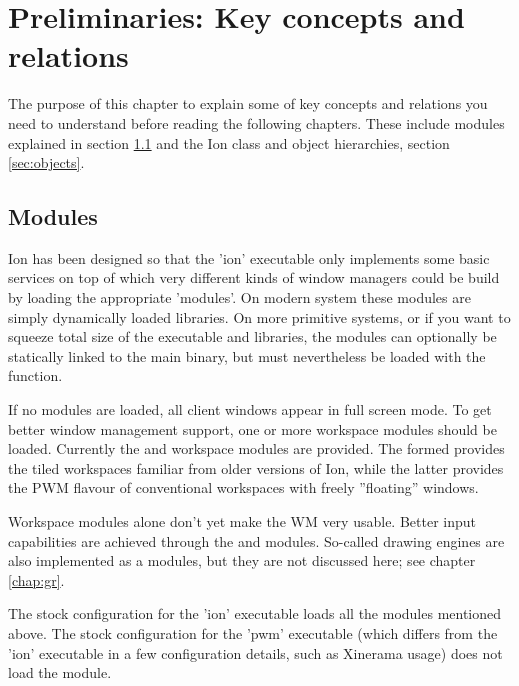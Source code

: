 
\chapter{Preliminaries: Key concepts and relations}
\label{chap:prelim}

The purpose of this chapter to explain some of key concepts and
relations you need to understand before reading the following
chapters. These include modules explained in section \ref{sec:modules}
and the Ion class and object hierarchies, section \ref{sec:objects}.


\section{Modules}
\label{sec:modules}

Ion has been designed so that the 'ion' executable only implements some
basic services on top of which very different kinds of window managers
could be build by loading the appropriate 'modules'. On modern system
these modules are simply dynamically loaded  libraries. On 
more primitive systems, or if you want to squeeze total size of the 
executable and libraries, the modules can optionally be statically 
linked to the main binary, but must nevertheless be loaded with the
 function.

If no modules are loaded, all client windows appear in full screen mode.
To get better window management support, one or more workspace modules
should be loaded. Currently the  and 
workspace modules are provided. The formed provides the tiled workspaces 
familiar from older versions of Ion, while the latter provides the PWM
flavour of conventional workspaces with freely ''floating'' windows.

Workspace modules alone don't yet make the WM very usable. Better
input capabilities are achieved through the  and 
modules. So-called drawing engines are also implemented as a modules,
but they are not discussed here; see chapter \ref{chap:gr}.

The stock configuration for the 'ion' executable loads all the modules
mentioned above. The stock configuration for the 'pwm' executable (which
differs from the 'ion' executable in a few configuration details, such
as Xinerama usage) does not load the  module.



